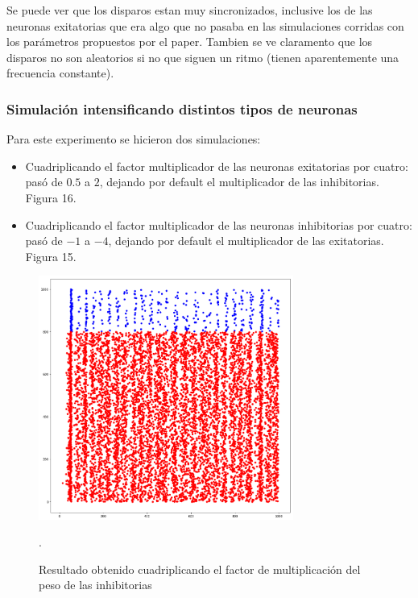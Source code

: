 \documentclass[12pt]{article}
\begin{document}
\newpage

Se puede ver que los disparos estan muy sincronizados, inclusive los de las neuronas exitatorias que era algo que no pasaba en las simulaciones corridas con los parámetros propuestos por el paper.
Tambien se ve claramento que los disparos no son aleatorios si no que siguen un ritmo (tienen aparentemente una frecuencia constante).

\subsubsection{Simulación intensificando distintos tipos de neuronas}
Para este experimento se hicieron dos simulaciones:
\begin{itemize}
    \item Cuadriplicando el factor multiplicador de las neuronas exitatorias por cuatro: pasó de $0.5$ a $2$, dejando por default el multiplicador de las inhibitorias. Figura 16.
    \item Cuadriplicando el factor multiplicador de las neuronas inhibitorias por cuatro: pasó de $-1$ a $-4$, dejando por default el multiplicador de las exitatorias. Figura 15.
\end{itemize}

\begin{figure}[htp!]
    \centering
        \includegraphics[height=8cm]{images/resultadoCuadrupleInhibitoria.png}
    \caption[fontsize=2pt]{Resultado obtenido cuadriplicando el factor de multiplicación del peso de las inhibitorias}.
\end{figure}
\end{document}
